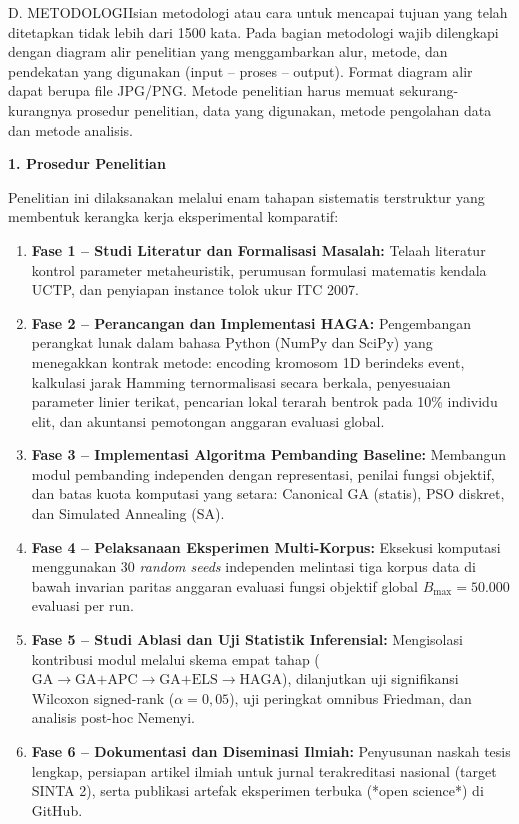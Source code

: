 \documentclass[letterpaper,12pt,oneside]{article}
\newcommand{\subheading}[2]{%
  \par\vspace{0.8em}\noindent
  \textbf{#1. #2}\par\vspace{0.3em}
}
\begin{document}
\noindent\begin{wordsection}{D. METODOLOGI}{Isian metodologi atau cara untuk mencapai tujuan yang telah ditetapkan tidak lebih dari 1500 kata. Pada bagian metodologi wajib dilengkapi dengan diagram alir penelitian yang menggambarkan alur, metode, dan pendekatan yang digunakan (input -- proses -- output). Format diagram alir dapat berupa file JPG/PNG. Metode penelitian harus memuat sekurang-kurangnya prosedur penelitian, data yang digunakan, metode pengolahan data dan metode analisis.}

\subheading{1}{Prosedur Penelitian}

Penelitian ini dilaksanakan melalui enam tahapan sistematis terstruktur yang membentuk kerangka kerja eksperimental komparatif:
\begin{enumerate}
    \item \textbf{Fase 1 -- Studi Literatur dan Formalisasi Masalah:} Telaah literatur kontrol parameter metaheuristik, perumusan formulasi matematis kendala UCTP, dan penyiapan instance tolok ukur ITC 2007.
    \item \textbf{Fase 2 -- Perancangan dan Implementasi HAGA:} Pengembangan perangkat lunak dalam bahasa Python (NumPy dan SciPy) yang menegakkan kontrak metode: encoding kromosom 1D berindeks event, kalkulasi jarak Hamming ternormalisasi secara berkala, penyesuaian parameter linier terikat, pencarian lokal terarah bentrok pada 10\% individu elit, dan akuntansi pemotongan anggaran evaluasi global.
    \item \textbf{Fase 3 -- Implementasi Algoritma Pembanding Baseline:} Membangun modul pembanding independen dengan representasi, penilai fungsi objektif, dan batas kuota komputasi yang setara: Canonical GA (statis), PSO diskret, dan Simulated Annealing (SA).
    \item \textbf{Fase 4 -- Pelaksanaan Eksperimen Multi-Korpus:} Eksekusi komputasi menggunakan 30 \textit{random seeds} independen melintasi tiga korpus data di bawah invarian paritas anggaran evaluasi fungsi objektif global $B_{\max} = 50.000$ evaluasi per run.
    \item \textbf{Fase 5 -- Studi Ablasi dan Uji Statistik Inferensial:} Mengisolasi kontribusi modul melalui skema empat tahap ($\text{GA} \to \text{GA+APC} \to \text{GA+ELS} \to \text{HAGA}$), dilanjutkan uji signifikansi Wilcoxon signed-rank ($\alpha=0{,}05$), uji peringkat omnibus Friedman, dan analisis post-hoc Nemenyi.
    \item \textbf{Fase 6 -- Dokumentasi dan Diseminasi Ilmiah:} Penyusunan naskah tesis lengkap, persiapan artikel ilmiah untuk jurnal terakreditasi nasional (target SINTA 2), serta publikasi artefak eksperimen terbuka (*open science*) di GitHub.
\end{enumerate}


\end{wordsection}
\end{document}
